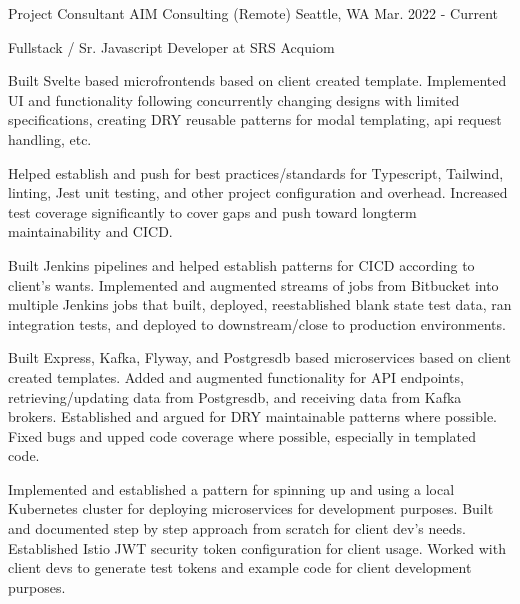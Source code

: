 

\begin{cventries}

\cventry
{Project Consultant} %
{AIM Consulting (Remote)} %
{Seattle, WA} %
{Mar. 2022 - Current} %
{
  \begin{cvitems} %
    \item[] {Fullstack / Sr. Javascript Developer at SRS Acquiom}
    \item[]
    \item {Built Svelte based microfrontends based on client created template. Implemented UI and functionality following concurrently changing designs with limited specifications, creating DRY reusable patterns for modal templating, api request handling, etc.}
    \item {Helped establish and push for best practices/standards for Typescript, Tailwind, linting, Jest unit testing, and other project configuration and overhead. Increased test coverage significantly to cover gaps and push toward longterm maintainability and CICD.}
    \item {Built Jenkins pipelines and helped establish patterns for CICD according to client's wants. Implemented and augmented streams of jobs from Bitbucket into multiple Jenkins jobs that built, deployed, reestablished blank state test data, ran integration tests, and deployed to downstream/close to production environments.}
    \item {Built Express, Kafka, Flyway, and Postgresdb based microservices based on client created templates. Added and augmented functionality for API endpoints, retrieving/updating data from Postgresdb, and receiving data from Kafka brokers. Established and argued for DRY maintainable patterns where possible. Fixed bugs and upped code coverage where possible, especially in templated code.}
    \item {Implemented and established a pattern for spinning up and using a local Kubernetes cluster for deploying microservices for development purposes. Built and documented step by step approach from scratch for client dev's needs. Established Istio JWT security token configuration for client usage. Worked with client devs to generate test tokens and example code for client development purposes.}

\end{cvitems}}
\end{cventries}
